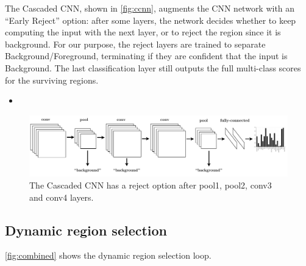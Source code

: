 The Cascaded CNN, shown in \autoref{fig:ccnn}, augments the CNN network with an ``Early Reject'' option: after some layers, the network decides whether to keep computing the input with the next layer, or to reject the region since it is background.
For our purpose, the reject layers are trained to separate Background/Foreground, terminating if they are confident that the input is Background. The last classification layer still outputs the full multi-class scores for the surviving regions.

\begin{itemize}
\itemsep1pt\parskip0pt
\item
\end{itemize}


\begin{figure}[h!]
\begin{center}
\includegraphics[width=0.98\columnwidth]{figures/ccnn.pdf}
\caption{
The Cascaded CNN has a reject option after pool1, pool2, conv3 and conv4 layers.
}\label{fig:ccnn}
\end{center}
\end{figure}

\subsection{Dynamic region selection}\label{sec:dynamic}

\autoref{fig:combined} shows the dynamic region selection loop.

